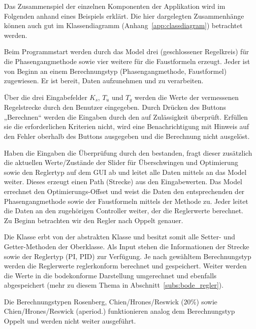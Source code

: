 Das Zusammenspiel der einzelnen Komponenten  der Applikation wird im Folgenden
anhand  eines   Beispiels  erkl\"art. Die  hier   dargelegten  Zusammenh\"ange
k\"onnen   auch   gut   im   Klassendiagramm   (Anhang~\ref{app:classdiagram})
betrachtet werden.

Beim   Programmstart   werden   durch  das   Model   drei   
(geschlossener  Regelkreis) f\"ur  die Phasengangmethode  sowie vier  weitere
f\"ur  die Faustformeln  erzeugt. Jeder   ist von  Beginn an
einem  Berechnungstyp  (Phasengangmethode,  Faustformel)  zugewiesen. Er  ist
bereit, Daten aufzunehmen und zu verarbeiten.

\"Uber die  drei Eingabefelder  $K_s$, $T_u$  und $T_g$  werden die  Werte der
vermessenen Regelstrecke  durch den  Benutzer eingegeben. Durch  Dr\"ucken des
Buttons  „Berechnen“ werden  die Eingaben  durch den   auf
Zul\"assigkeit  \"uberpr\"uft. Erf\"ullen  sie  die  erforderlichen  Kriterien
nicht,  wird eine  Benachrichtigung mit  Hinweis auf  den Fehler  oberhalb des
Buttons ausgegeben und die Berechnung nicht ausgel\"ost.

Haben  die   Eingaben  die  \"Uberpr\"ufung  durch   den  
bestanden,  fragt  dieser  zus\"atzlich  die  aktuellen  Werte/Zust\"ande  der
Slider  f\"ur \"Uberschwingen  und  Optimierung sowie  den  Reglertyp auf  dem
GUI  ab  und   leitet  alle  Daten  mittels     an  das  Model
weiter. Dieses erzeugt  einen Path (Strecke) aus  den Eingabewerten. Das Model
errechnet  den  Optimierungs-Offset und  weist  die  Daten den  entsprechenden
 der  Phasengangmethode sowie der Faustformeln  mittels der
Methode   zu. Jeder  leitet die  Daten an den
zugeh\"origen  Controller weiter,  der  die  Reglerwerte berechnet. Zu  Beginn
betrachten wir den Regler nach Oppelt genauer.

Die  Klasse   erbt  von der  abstrakten Klasse  
und  besitzt  somit  alle  Setter-  und  Getter-Methoden  der  Oberklasse. Als
Input  stehen die  Informationen der  Strecke  sowie der  Reglertyp (PI,  PID)
zur  Verf\"ugung. Je nach  gew\"ahltem Berechnungstyp  werden die  Reglerwerte
reglerkonform  berechnet  und  gespeichert. Weiter  werden die  Werte  in  die
bodekonforme  Darstellung umgerechnet  und  ebenfalls  abgespeichert (mehr  zu
diesem Thema in Abschnitt~\ref{subs:bode_regler}).

Die    Berechnungstypen   Rosenberg,    Chien/Hrones/Reswick   (20\%)    sowie
Chien/Hrones/Reswick (aperiod.) funktionieren analog dem Berechnungstyp Oppelt
und werden nicht weiter ausgef\"uhrt.

